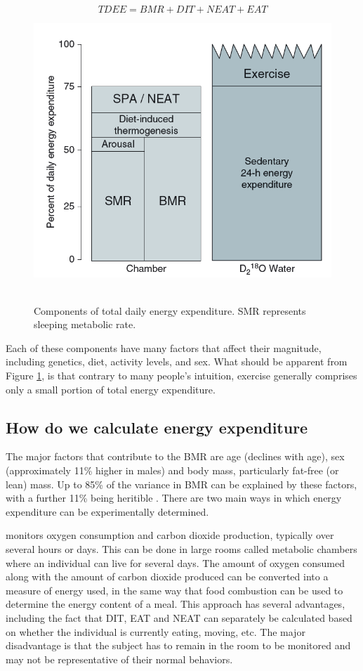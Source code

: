 \documentclass{tufte-handout}
\begin{document}
\begin{equation}
TDEE = BMR + DIT + NEAT + EAT
\end{equation}

\begin{figure}
\includegraphics{figures/tdee-components.png}\
\caption{Components of total daily energy expenditure.  SMR represents sleeping metabolic rate.}
\label{fig:tdee-components}
\end{figure}

Each of these components have many factors that affect their magnitude, including genetics, diet, activity levels, and sex.  What should be apparent from Figure \ref{fig:tdee-components}, is that contrary to many people's intuition, exercise generally comprises only a small portion of total energy expenditure.

\subsection{How do we calculate energy expenditure}

The major factors that contribute to the BMR are age (declines with age), sex (approximately 11\% higher in males) and body mass, particularly fat-free (or lean) mass.  Up to 85\% of the variance in BMR can be explained by these factors, with a further 11\% being heritible \cite{Bogardus1986}.  There are two main ways in which energy expenditure can be experimentally determined.

 monitors oxygen consumption and carbon dioxide production, typically over several hours or days.  This can be done in large rooms called metabolic chambers where an individual can live for several days.  The amount of oxygen consumed along with the amount of carbon dioxide produced can be converted into a measure of energy used, in the same way that food combustion can be used to determine the energy content of a meal.  This approach has several advantages, including the fact that DIT, EAT and NEAT can separately be calculated based on whether the individual is currently eating, moving, etc.  The major disadvantage is that the subject has to remain in the room to be monitored and may not be representative of their normal behaviors.
\end{document}

